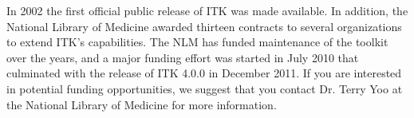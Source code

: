 In 2002 the first official public release of ITK was made available. In
addition, the National Library of Medicine awarded thirteen contracts to
several organizations to extend ITK's capabilities. The NLM has funded
maintenance of the toolkit over the years, and a major funding effort was
started in July 2010 that culminated with the release of ITK 4.0.0 in
December 2011.  If you are interested in potential funding opportunities,
we suggest that you contact Dr. Terry Yoo at the National Library of Medicine
for more information.
